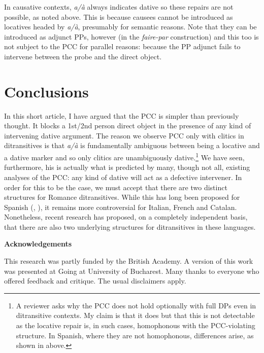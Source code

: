 \documentclass[output=paper,modfonts,nonflat]{langsci/langscibook}
\begin{document}
In causative contexts, \textit{a/à} always indicates dative so these repairs are not possible, as noted above. This is because causees cannot be introduced as locatives headed by \textit{a/à}, presumably for semantic reasons. Note that they can be introduced as adjunct PPs, however (in the \textit{faire-par} construction) and this too is not subject to the PCC for parallel reasons: because the PP adjunct fails to intervene between the probe and the direct object. 

\section{Conclusions} %

In this short article, I have argued that the PCC is simpler than previously thought. It blocks a 1st/2nd person direct object in the presence of any kind of intervening dative argument. The reason we observe PCC only with clitics in ditransitives is that \textit{a/à} is fundamentally ambiguous between being a locative and a dative marker and so only clitics are unambiguously dative.\footnote{A reviewer asks why the PCC does not hold optionally with full DPs even in ditransitive contexts. My claim is that it does but that this is not detectable as the locative repair is, in such cases, homophonous with the PCC-violating structure. In Spanish, where they are not homophonous, differences arise, as shown in  above.} \textsuperscript{} We have seen, furthermore, his is actually what is predicted by many, though not all, existing analyses of the PCC: any kind of dative will act as a defective intervener. In order for this to be the case, we must accept that there are two distinct structures for Romance ditransitives. While this has long been proposed for Spanish (\citealt{Demonte1995}, \citealt{Cuervo2003}), it remains more controversial for Italian, French and Catalan. Nonetheless, recent research has proposed, on a completely independent basis, that there are also two underlying structures for ditransitives in these languages. 

\textbf{Acknowledgements}

This research was partly funded by the British Academy. A version of this work was presented at Going \citealt{Romance2017} at University of Bucharest. Many thanks to everyone who offered feedback and critique. The usual disclaimers apply. 
\end{document}
